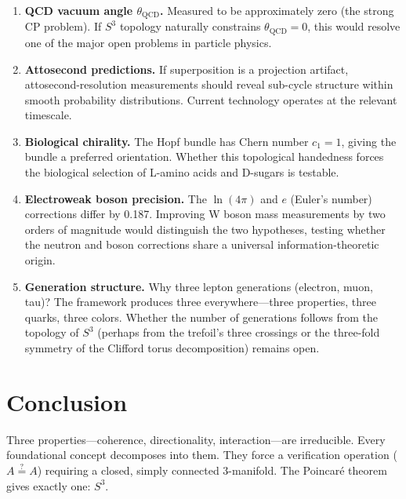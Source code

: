 \documentclass[12pt]{article}
\begin{document}
\begin{enumerate}
\item \textbf{QCD vacuum angle $\theta_{\mathrm{QCD}}$.} Measured to be approximately zero (the strong CP problem). If $S^3$ topology naturally constrains $\theta_{\mathrm{QCD}} = 0$, this would resolve one of the major open problems in particle physics.

\item \textbf{Attosecond predictions.} If superposition is a projection artifact, attosecond-resolution measurements should reveal sub-cycle structure within smooth probability distributions. Current technology operates at the relevant
timescale.

\item \textbf{Biological chirality.} The Hopf bundle has Chern number $c_1 = 1$, giving the bundle a preferred orientation. Whether this topological handedness forces the biological selection of L-amino acids and D-sugars is testable.

\item \textbf{Electroweak boson precision.} The $\ln(4\pi)$ and $e$ (Euler's number) corrections differ by 0.187. Improving W boson mass measurements by two orders of magnitude would distinguish the two hypotheses, testing whether the neutron and boson corrections share a universal information-theoretic origin.

\item \textbf{Generation structure.} Why three lepton generations (electron, muon, tau)? The framework produces three everywhere---three properties, three quarks, three colors. Whether the number of generations follows from the topology of $S^3$ (perhaps from the trefoil's three crossings or the three-fold symmetry of the Clifford torus decomposition) remains open.

\end{enumerate}


\section{Conclusion}

Three properties---coherence, directionality, interaction---are irreducible. Every foundational concept decomposes into them. They force a verification operation ($A \stackrel{?}{=} A$) requiring a closed, simply connected 3-manifold. The Poincar\'e theorem gives exactly one: $S^3$.
\end{document}
